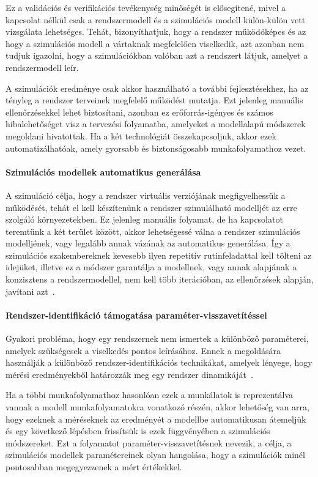         Ez a validációs és verifikációs tevékenység minőségét is elősegítené, mivel a kapcsolat nélkül csak a rendszermodell és a szimulációs modell külön-külön vett vizsgálata lehetséges.
        Tehát, bizonyíthatjuk, hogy a rendszer működőképes és az hogy a szimulációs modell a vártaknak megfelelően viselkedik, azt azonban nem tudjuk igazolni, hogy a szimulációkban valóban azt a rendszert látjuk, amelyet a rendszermodell leír.
        
        A szimulációk eredménye csak akkor használható a további fejlesztésekhez, ha az tényleg a rendszer terveinek megfelelő működést mutatja.
        Ezt jelenleg manuális ellenőrzésekkel lehet biztosítani, azonban ez erőforrás-igényes és számos hibalehetőséget visz a tervezési folyamatba, amelyeket a modellalapú módszerek megoldani hivatottak.
        Ha a két technológiát összekapcsoljuk, akkor ezek automatizálhatóak, amely gyorsabb és biztonságosabb munkafolyamathoz vezet.

        \paragraph{Szimulációs modellek automatikus generálása}
        A szimuláció célja, hogy a rendszer virtuális verziójának megfigyelhessük a működését, tehát el kell készítenünk a rendszer szimulálható modelljét az erre szolgáló környezetekben.
        Ez jelenleg manuális folyamat, de ha kapcsolatot teremtünk a két terület között, akkor lehetségessé válna a rendszer szimulációs modelljének, vagy legalább annak vázának az automatikus generálása.
        Így a szimulációs szakembereknek kevesebb ilyen repetitív rutinfeladattal kell tölteni az idejüket, illetve ez a módszer garantálja a modellnek, vagy annak alapjának a konzisztens a rendszermodellel, nem kell több iterációban, az ellenőrzések alapján, javítani azt~\cite{Ma_2022}.

        \paragraph{Rendszer-identifikáció támogatása paraméter-visszavetítéssel}
        Gyakori probléma, hogy egy rendszernek nem ismertek a különböző paraméterei, amelyek szükségesek a viselkedés pontos leírásához.
        Ennek a megoldására használják a különböző rendszer-identifikációs technikákat, amelyek lényege, hogy mérési eredményekből határozzák meg egy rendszer dinamikáját~\cite{Mathworks}.

        Ha a többi munkafolyamathoz hasonlóan ezek a munkálatok is reprezentálva vannak a modell munkafolyamatokra vonatkozó részén, akkor lehetőség van arra,
        hogy ezeknek a méréseknek az eredményét a modellbe automatikusan átemeljük és egy következő lépésben frissítsük is ezek függvényében a szimulációs módszereket.
        Ezt a folyamatot paraméter-visszavetítésnek nevezik, a célja, a szimulációs modellek paramétereinek olyan hangolása, hogy a szimulációk minél pontosabban megegyezzenek a mért értékekkel.

